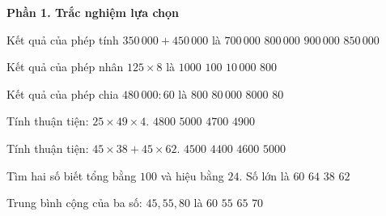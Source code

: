 \textbf{Phần 1. Trắc nghiệm lựa chọn}

\begin{ex} %
Kết quả của phép tính $350\,000 + 450\,000$ là
\choice
{$700\,000$}
{\True $800\,000$}
{$900\,000$}
{$850\,000$}
\end{ex}

\begin{ex} %
Kết quả của phép nhân $125 \times 8$ là
\choice
{\True $1000$}
{$100$}
{$10\,000$}
{$800$}
\end{ex}

\begin{ex} %
Kết quả của phép chia $480\,000 : 60$ là
\choice
{$800$}
{$80\,000$}
{\True $8000$}
{$80$}
\end{ex}

\begin{ex} %
Tính thuận tiện: $25 \times 49 \times 4$.
\choice
{$4800$}
{$5000$}
{$4700$}
{\True $4900$}
\end{ex}

\begin{ex} %
Tính thuận tiện: $45 \times 38 + 45 \times 62$.
\choice
{\True $4500$}
{$4400$}
{$4600$}
{$5000$}
\end{ex}

\begin{ex} %
Tìm hai số biết tổng bằng $100$ và hiệu bằng $24$. Số lớn là
\choice
{$60$}
{$64$}
{$38$}
{\True $62$}
\end{ex}

\begin{ex} %
Trung bình cộng của ba số: $45, 55, 80$ là
\choice
{\True $60$}
{$55$}
{$65$}
{$70$}
\end{ex}

